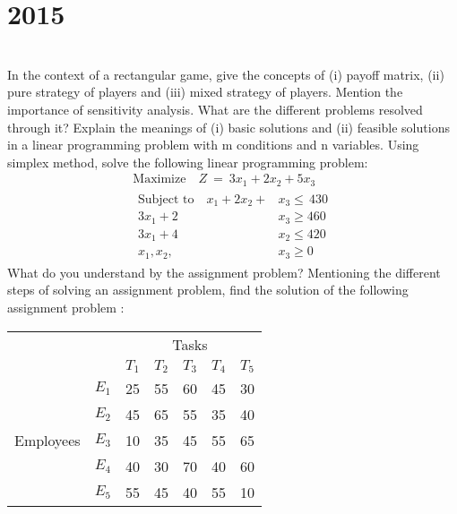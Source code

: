 \section*{2015}
\vspace{-.5cm}
\hrulefill \smallskip\\
 In the context of a rectangular game, give the concepts of (i) payoff matrix, (ii) pure strategy of players and (iii) mixed strategy of players.
\myline
{} Mention the importance of sensitivity analysis. What are the different problems resolved through it?
\myline
{} Explain the meanings of (i) basic solutions and (ii) feasible solutions in a linear programming problem with m conditions and n variables. Using simplex method, solve the following linear programming problem:
\begin{gather*}
    \text{Maximize} \quad Z \:= \:3x_1 +2x_2 + 5x_3 \\
    \begin{aligned}
        \text{Subject to} \quad  x_1 +2x_2  + &x_3\leq \,430  \\
         3x_1 +  2&x_3  \geq 460 \\
                3x_1 + 4&x_2 \leq 420 \\
            x_1,x_2,&x_3 \geq 0
    \end{aligned}
\end{gather*}
 What do you understand by the assignment problem? Mentioning the different steps of solving an assignment problem, find the solution of the following assignment problem :
\begin{table}[!htbp]
\centering
\begin{tabular}{ccccccc}
& & \multicolumn{5}{c}{Tasks} \\
& & $T_1$ & $T_2$ & $T_3$ & $T_4$ & $T_5$\\ \cline{3-7}
\multicolumn{1}{c}{\multirow{5}{*}{Employees}} &
\multicolumn{1}{c|}{$E_1$} & 25 & 55 & 60 & 45 & \multicolumn{1}{c|}{30}\\
&\multicolumn{1}{c|}{$E_2$} & 45 & 65 & 55 & 35 & \multicolumn{1}{c|}{40}\\
&\multicolumn{1}{c|}{$E_3$} & 10 & 35 & 45 & 55 & \multicolumn{1}{c|}{65}\\
&\multicolumn{1}{c|}{$E_4$} & 40 & 30 & 70 & 40 & \multicolumn{1}{c|}{60}\\
&\multicolumn{1}{c|}{$E_5$} & 55 & 45 & 40 & 55 & \multicolumn{1}{c|}{10}\\
\cline{3-7}
\end{tabular} 
\end{table} \\